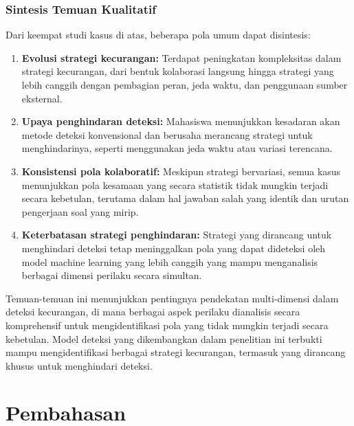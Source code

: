 \subsubsection{Sintesis Temuan Kualitatif}

Dari keempat studi kasus di atas, beberapa pola umum dapat disintesis:

\begin{enumerate}
    \item \textbf{Evolusi strategi kecurangan:} Terdapat peningkatan kompleksitas dalam strategi kecurangan, dari bentuk kolaborasi langsung hingga strategi yang lebih canggih dengan pembagian peran, jeda waktu, dan penggunaan sumber eksternal.
    
    \item \textbf{Upaya penghindaran deteksi:} Mahasiswa menunjukkan kesadaran akan metode deteksi konvensional dan berusaha merancang strategi untuk menghindarinya, seperti menggunakan jeda waktu atau variasi terencana.
    
    \item \textbf{Konsistensi pola kolaboratif:} Meskipun strategi bervariasi, semua kasus menunjukkan pola kesamaan yang secara statistik tidak mungkin terjadi secara kebetulan, terutama dalam hal jawaban salah yang identik dan urutan pengerjaan soal yang mirip.
    
    \item \textbf{Keterbatasan strategi penghindaran:} Strategi yang dirancang untuk menghindari deteksi tetap meninggalkan pola yang dapat dideteksi oleh model machine learning yang lebih canggih yang mampu menganalisis berbagai dimensi perilaku secara simultan.
\end{enumerate}

Temuan-temuan ini menunjukkan pentingnya pendekatan multi-dimensi dalam deteksi kecurangan, di mana berbagai aspek perilaku dianalisis secara komprehensif untuk mengidentifikasi pola yang tidak mungkin terjadi secara kebetulan. Model deteksi yang dikembangkan dalam penelitian ini terbukti mampu mengidentifikasi berbagai strategi kecurangan, termasuk yang dirancang khusus untuk menghindari deteksi.

\section{Pembahasan}
\label{sec:pembahasan}


